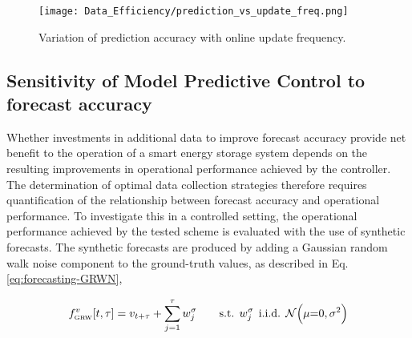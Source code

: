 \begin{figure}[h]
    \centering
    \texttt{[image: Data\_Efficiency/prediction\_vs\_update\_freq.png]}
    \caption{Variation of prediction accuracy with online update frequency.}
    \label{fig:forecasting-data-eff-update-freq}
\end{figure}


\newpage
\subsection{Sensitivity of Model Predictive Control to forecast accuracy} \label{sec:forecasting-control-sensitivity}


Whether investments in additional data to improve forecast accuracy provide net benefit to the operation of a smart energy storage system depends on the resulting improvements in operational performance achieved by the  controller. The determination of optimal data collection strategies therefore requires quantification of the relationship between forecast accuracy and  operational performance. To investigate this in a controlled setting, the operational performance achieved by the tested  scheme is evaluated with the use of synthetic forecasts. The synthetic forecasts are produced by adding a Gaussian random walk noise component to the ground-truth values, as described in Eq. \ref{eq:forecasting-GRWN},

\begin{equation} \label{eq:forecasting-GRWN}
    f_{\mathsmaller{\textrm{GRW}}}^v[t,\tau] = v_{t+\tau} + \sum_{j=1}^{\tau} w_j^{\sigma} \qquad \textrm{s.t.} \:\: w_j^{\sigma} \:\: \textrm{i.i.d.} \:\: \mathcal{N}\!\left( \mu{=}0, \sigma^2 \right)
\end{equation}

